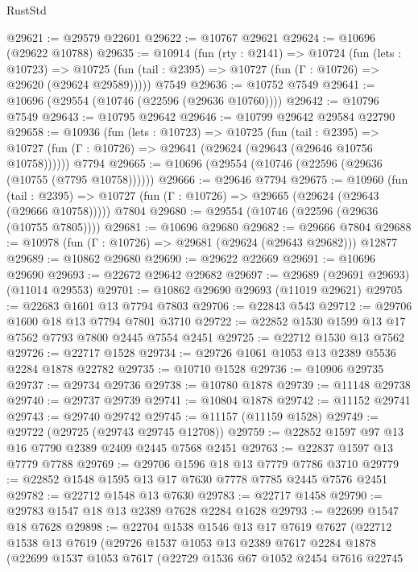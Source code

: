 \begin{lexlean}{RustStd}
\begin{coremodule}
@29621 := @29579 @22601
@29622 := @10767 @29621
@29624 := @10696 (@29622 @10788)
@29635 := @10914
    (fun (rty : @2141) =>
    @10724
      (fun (lets : @10723) =>
      @10725 (fun (tail : @2395) => @10727 (fun (Γ : @10726) => @29620 (@29624 @29589)))))
    @7549
@29636 := @10752 @7549
@29641 := @10696 (@29554 (@10746 (@22596 (@29636 @10760))))
@29642 := @10796 @7549
@29643 := @10795 @29642
@29646 := @10799 @29642 @29584 @22790
@29658 := @10936
    (fun (lets : @10723) =>
    @10725
      (fun (tail : @2395) =>
      @10727 (fun (Γ : @10726) => @29641 (@29624 (@29643 (@29646 @10756 @10758))))))
    @7794
@29665 := @10696 (@29554 (@10746 (@22596 (@29636 (@10755 (@7795 @10758))))))
@29666 := @29646 @7794
@29675 := @10960
    (fun (tail : @2395) => @10727 (fun (Γ : @10726) => @29665 (@29624 (@29643 (@29666 @10758)))))
    @7804
@29680 := @29554 (@10746 (@22596 (@29636 (@10755 @7805))))
@29681 := @10696 @29680
@29682 := @29666 @7804
@29688 := @10978 (fun (Γ : @10726) => @29681 (@29624 (@29643 @29682))) @12877
@29689 := @10862 @29680
@29690 := @29622 @22669
@29691 := @10696 @29690
@29693 := @22672 @29642 @29682
@29697 := @29689 (@29691 @29693) (@11014 @29553)
@29701 := @10862 @29690 @29693 (@11019 @29621)
@29705 := @22683 @1601 @13 @7794 @7803
@29706 := @22843 @543
@29712 := @29706 @1600 @18 @13 @7794 @7801 @3710
@29722 := @22852 @1530 @1599 @13 @17 @7562 @7793 @7800 @2445 @7554 @2451
@29725 := @22712 @1530 @13 @7562
@29726 := @22717 @1528
@29734 := @29726 @1061 @1053 @13 @2389 @5536 @2284 @1878 @22782
@29735 := @10710 @1528
@29736 := @10906 @29735
@29737 := @29734 @29736
@29738 := @10780 @1878
@29739 := @11148 @29738
@29740 := @29737 @29739
@29741 := @10804 @1878
@29742 := @11152 @29741
@29743 := @29740 @29742
@29745 := @11157 (@11159 @1528)
@29749 := @29722 (@29725 (@29743 @29745 @12708))
@29759 := @22852 @1597 @97 @13 @16 @7790 @2389 @2409 @2445 @7568 @2451
@29763 := @22837 @1597 @13 @7779 @7788
@29769 := @29706 @1596 @18 @13 @7779 @7786 @3710
@29779 := @22852 @1548 @1595 @13 @17 @7630 @7778 @7785 @2445 @7576 @2451
@29782 := @22712 @1548 @13 @7630
@29783 := @22717 @1458
@29790 := @29783 @1547 @18 @13 @2389 @7628 @2284 @1628
@29793 := @22699 @1547 @18 @7628
@29898 := @22704
    @1538
    @1546
    @13
    @17
    @7619
    @7627
    (@22712
      @1538
      @13
      @7619
      (@29726
        @1537
        @1053
        @13
        @2389
        @7617
        @2284
        @1878
        (@22699
          @1537
          @1053
          @7617
          (@22729
            @1536
            @67
            @1052
            @2454
            @7616
            @22745

\end{coremodule}
\end{lexlean}

